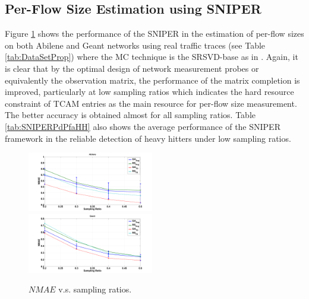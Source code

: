 \subsection{Per-Flow Size Estimation using SNIPER}
Figure \ref{fig:AbileneGeantGATMC} shows the performance of the SNIPER in the estimation of per-flow sizes on both Abilene and Geant networks using real traffic traces (see Table \ref{tab:DataSetProp}) where the MC technique is the SRSVD-base as in \cite{Roughan:2012}. Again, it is clear that by the optimal design of network measurement probes or equivalently the observation matrix, the performance of the matrix completion is improved, particularly at low sampling ratios which indicates the hard resource constraint of TCAM entries as the main resource for per-flow size measurement. The better accuracy is obtained almost for all sampling ratios. Table \ref{tab:SNIPERPdPfaHH} also shows the average performance of the SNIPER framework in the reliable detection of heavy hitters under low sampling ratios.  
\begin{figure}
  \begin{center}
    {\includegraphics[keepaspectratio, width=0.49\textwidth]{AbileneGATMC.png}} \\
    {\includegraphics[keepaspectratio, width=0.49\textwidth]{GeantGATMC.png}}
  \end{center}
  \caption{{{$NMAE$ v.s. sampling ratios.}}}
  \label{fig:AbileneGeantGATMC}
\end{figure}

